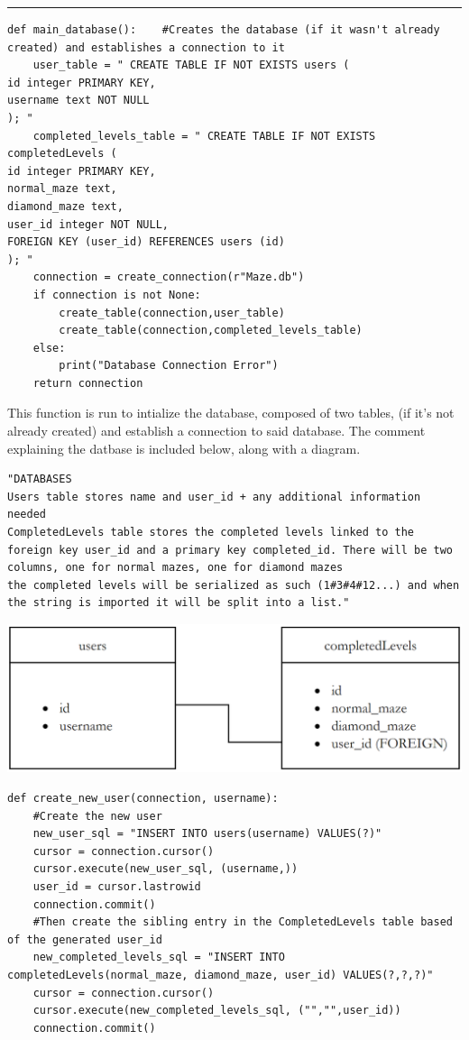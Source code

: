\documentclass{article}
\begin{document}
\textcolor[RGB]{220,220,220}{\rule{\linewidth}{0.2pt}}
\begin{lstlisting}
def main_database():    #Creates the database (if it wasn't already created) and establishes a connection to it 
    user_table = " CREATE TABLE IF NOT EXISTS users (
id integer PRIMARY KEY,
username text NOT NULL
); "
    completed_levels_table = " CREATE TABLE IF NOT EXISTS completedLevels (
id integer PRIMARY KEY,
normal_maze text,
diamond_maze text,
user_id integer NOT NULL,
FOREIGN KEY (user_id) REFERENCES users (id)
); " 
    connection = create_connection(r"Maze.db")
    if connection is not None:
        create_table(connection,user_table)
        create_table(connection,completed_levels_table)
    else:
        print("Database Connection Error")
    return connection
\end{lstlisting}
This function is run to intialize the database, composed of two tables, (if it's not already created) and  establish a connection to said database.
The comment explaining the datbase is included below, along with a diagram.
\begin{lstlisting}
"DATABASES
Users table stores name and user_id + any additional information needed
CompletedLevels table stores the completed levels linked to the foreign key user_id and a primary key completed_id. There will be two columns, one for normal mazes, one for diamond mazes
the completed levels will be serialized as such (1#3#4#12...) and when the string is imported it will be split into a list."
\end{lstlisting}
\begin{center}
	\includegraphics[scale=0.5]{Database Diagram}
\end{center}
\begin{lstlisting}
def create_new_user(connection, username):
    #Create the new user
    new_user_sql = "INSERT INTO users(username) VALUES(?)"
    cursor = connection.cursor()
    cursor.execute(new_user_sql, (username,))
    user_id = cursor.lastrowid
    connection.commit()
    #Then create the sibling entry in the CompletedLevels table based of the generated user_id
    new_completed_levels_sql = "INSERT INTO completedLevels(normal_maze, diamond_maze, user_id) VALUES(?,?,?)"
    cursor = connection.cursor()
    cursor.execute(new_completed_levels_sql, ("","",user_id))
    connection.commit()
\end{lstlisting}
\end{document}
